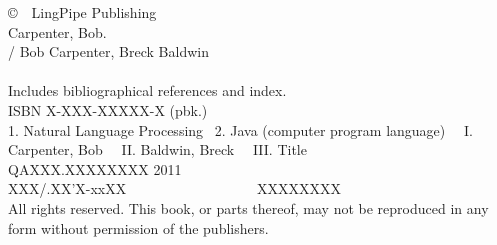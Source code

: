 \clearpage
\pagestyle{empty}
\vspace*{1.25in}
\noindent
{\footnotesize%
\copyright \ \ LingPipe Publishing
\hfill
\vfill
\vfill
{}
\\[6pt]
Carpenter, Bob.
\\
\hspace*{0.125in}{\it Text Analysis with LingPipe 4.0} / Bob
Carpenter, Breck Baldwin
\\
\hspace*{.5in}{p. cm.}
\\
\hspace*{0.125in}Includes bibliographical references and index.
\\
\hspace*{0.125in}ISBN X-XXX-XXXXX-X (pbk.)
\\[4pt]
1. Natural Language Processing  \ 2. Java (computer program language)
\ \ I. Carpenter, Bob \ \ II. Baldwin, Breck \ \ III. Title
\\[2pt]
\hspace*{0.125in}QAXXX.XXXXXXXX 2011
\\[2pt]
\hspace*{0.125in}XXX/.XX'X-xxXX      \ \ \ \ \ \ \ \ \ \ \ \ \ \ \ \ \  \ XXXXXXXX
\vfill
\\[12pt]
All rights reserved. This book, or parts thereof, may not
be reproduced in any form without permission of the publishers.
}

